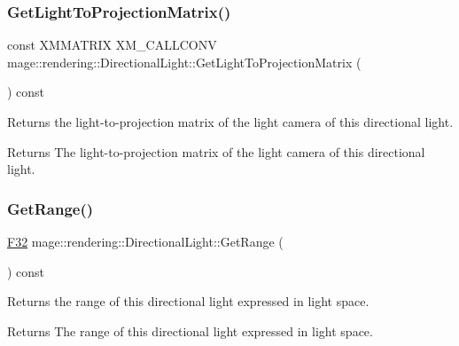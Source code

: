 \subsubsection{\texorpdfstring{Get\+Light\+To\+Projection\+Matrix()}{GetLightToProjectionMatrix()}}
{\footnotesize\ttfamily const X\+M\+M\+A\+T\+R\+IX X\+M\+\_\+\+C\+A\+L\+L\+C\+O\+NV mage\+::rendering\+::\+Directional\+Light\+::\+Get\+Light\+To\+Projection\+Matrix (\begin{DoxyParamCaption}{ }\end{DoxyParamCaption}) const\hspace{0.3cm}{\ttfamily [noexcept]}}

Returns the light-\/to-\/projection matrix of the light camera of this directional light.

\begin{DoxyReturn}{Returns}
The light-\/to-\/projection matrix of the light camera of this directional light. 
\end{DoxyReturn}
\mbox{\label{classmage_1_1rendering_1_1_directional_light_a488b39bbc5f602fcc4aede228e971a18}} 
\subsubsection{\texorpdfstring{Get\+Range()}{GetRange()}}
{\footnotesize\ttfamily \mbox{\hyperlink{namespacemage_aa97e833b45f06d60a0a9c4fc22ae02c0}{F32}} mage\+::rendering\+::\+Directional\+Light\+::\+Get\+Range (\begin{DoxyParamCaption}{ }\end{DoxyParamCaption}) const\hspace{0.3cm}{\ttfamily [noexcept]}}

Returns the range of this directional light expressed in light space.

\begin{DoxyReturn}{Returns}
The range of this directional light expressed in light space. 
\end{DoxyReturn}
\mbox{\label{classmage_1_1rendering_1_1_directional_light_ace3c9b19fcb107d45ecff698eb5c0d36}} 
